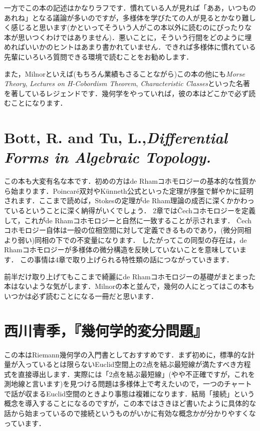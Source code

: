 \documentclass[uplatex]{jsarticle}
\begin{document}
一方でこの本の記述はかなりラフです．慣れている人が見れば「ああ，いつものあれね」となる議論が多いのですが，多様体を学びたての人が見るとかなり難しく感じると思います(かといってそういう人がこの本以外に読むのにぴったりな本が思いつくわけではありません)．悪いことに，そういう行間をどのように埋めればいいかのヒントはあまり書かれていません．できれば多様体に慣れている先輩にいろいろ質問できる環境で読むことをお勧めします．

また，Milnorといえば(もちろん業績もさることながら)この本の他にも{\textit{Morse Theory}, \textit{Lectures on H-Cobordism Theorem}, \textit{Characteristic Classes}}といった名著を著しているレジェンドです．幾何学をやっていれば，彼の本はどこかで必ず読むことになります．

\section*{Bott, R. and Tu, L.,\textit{Differential Forms in Algebraic Topology.}}

この本も大変有名な本です．初めの方はde Rhamコホモロジーの基本的な性質から始まります．Poincar\'{e}双対やK\"{u}nneth公式といった定理が序盤で鮮やかに証明されます．ここまで読めば，Stokesの定理がde Rham理論の成否に深くかかわっているということに深く納得がいくでしょう．
2章では\v{C}echコホモロジーを定義して，これがde Rhamコホモロジーと自然に一致することが示されます．
\v{C}echコホモロジー自体は一般の位相空間に対して定義できるものであり，(微分同相より弱い)同相の下での不変量になります．
したがってこの同型の存在は，de Rhamコホモロジーが多様体の微分構造を反映していないことを意味しています．
この事情は4章で取り上げられる特性類の話につながっていきます．

前半だけ取り上げてもここまで綺麗にde Rhamコホモロジーの基礎がまとまった本はないような気がします．Milnorの本と並んで，幾何の人にとってはこの本もいつかは必ず読むことになる一冊だと思います．

\section*{西川青季，『幾何学的変分問題』}

この本はRiemann幾何学の入門書としておすすめです．まず初めに，標準的な計量が入っているとは限らないEuclid空間上の2点を結ぶ最短線が満たすべき方程式を直接導出します．実際には「2点を結ぶ最短線」(やや不正確ですが，これを測地線と言います)を見つける問題は多様体上で考えたいので，一つのチャートで話が収まるEuclid空間のときより事態は複雑になります．結局「接続」という概念を導入することになるのですが，この本ではさきほど書いたように具体的な話から始まっているので接続というものがいかに有効な概念かが分かりやすくなっています．
\end{document}
